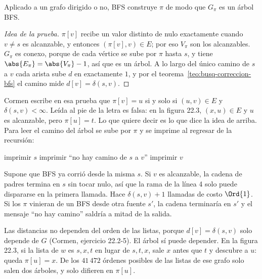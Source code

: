 \documentclass[11pt,letterpaper]{article}
\begin{document}
\begin{lema}
  \label{lem:busq-arbol-bfs}
  Aplicado a un grafo dirigido o no, BFS construye $\pi$ de modo que
  $G_\pi$ es un árbol BFS.
\end{lema}

\begin{proof}[Idea de la prueba]
  $\pi[v]$ recibe un valor distinto de nulo exactamente cuando
  $v \neq s$ es alcanzable, y entonces $(\pi[v], v) \in E$; por eso
  $V_\pi$ son los alcanzables. $G_\pi$ es conexo, porque de cada
  vértice se sube por $\pi$ hasta $s$, y tiene
  $\abs{E_\pi} = \abs{V_\pi} - 1$, así que es un árbol. A lo largo del
  único camino de $s$ a $v$ cada arista sube $d$ en exactamente $1$,
  y por el teorema~\ref{teo:busq-correccion-bfs} el camino mide
  $d[v] = \delta(s, v)$.
\end{proof}

Cormen escribe en esa prueba que $\pi[v] = u$ si y solo si
$(u, v) \in E$ y $\delta(s, v) < \infty$. Leída al pie de la letra es
falsa: en la figura 22.3, $(x, u) \in E$ y $u$ es alcanzable, pero
$\pi[u] = t$. Lo que quiere decir es lo que dice la idea de arriba.
Para leer el camino del árbol se sube por $\pi$ y se imprime al
regresar de la recursión:

\begin{algorithm}[H]
\caption{\textsc{Imprimir-Camino}$(G, s, v)$}
\label{alg:busq-imprimir-camino}
\begin{algorithmic}[1]
    \State imprimir $s$
    \State imprimir ``no hay camino de $s$ a $v$''
  \Else
    \State {}
    \State imprimir $v$
  \EndIf
\EndProcedure
\end{algorithmic}
\end{algorithm}

Supone que BFS ya corrió desde la misma $s$. Si $v$ es alcanzable, la
cadena de padres termina en $s$ sin tocar nulo, así que la rama de la
línea 4 solo puede dispararse en la primera llamada. Hace
$\delta(s, v) + 1$ llamadas de costo $\Ord{1}$. Si los $\pi$ vinieran
de un BFS desde otra fuente $s'$, la cadena terminaría en $s'$ y el
mensaje ``no hay camino'' saldría a mitad de la salida.

\begin{observacion}
  Las distancias no dependen del orden de las listas, porque
  $d[v] = \delta(s, v)$ solo depende de $G$ (Cormen, ejercicio
  22.2-5). El árbol sí puede depender. En la figura 22.3, si la lista
  de $w$ es $s, x, t$ en lugar de $s, t, x$, sale $x$ antes que $t$ y
  descubre a $u$: queda $\pi[u] = x$. De los $41\,472$ órdenes
  posibles de las listas de ese grafo solo salen dos árboles, y solo
  difieren en $\pi[u]$.
\end{observacion}
\end{document}
